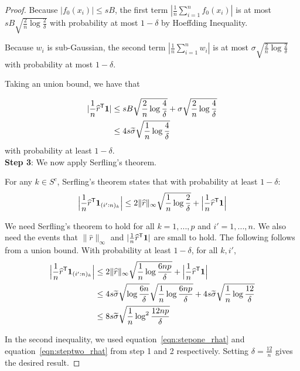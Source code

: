 \begin{proof}
Because $|f_0(x_i)| \leq sB$, the first term $| \frac{1}{n} \sum_{i=1}^n f_0(x_i)|$ is at most $sB \sqrt{\frac{2}{n} \log \frac{2}{\delta}}$ with probability at most $1-\delta$ by Hoeffding Inequality.

Because $w_i$ is sub-Gaussian, the second term $|\frac{1}{n} \sum_{i=1}^n w_i|$ is at most $\sigma \sqrt{ \frac{2}{n} \log \frac{2}{\delta}}$ with probability at most $1-\delta$.

Taking an union bound, we have that 

\begin{align}
| \frac{1}{n} \widehat{r}^{\mathsf{T}} \mbox{\boldmath $1$}| &\leq sB \sqrt{\frac{2}{n} \log \frac{4}{\delta}} +  \sigma \sqrt{\frac{2}{n} \log \frac{4}{\delta}} \nonumber \\
  &\leq 4 s \widetilde{\sigma} \sqrt{\frac{1}{n} \log \frac{4}{\delta}} \label{eqn:steptwo_rhat}
\end{align}
with probability at least $1-\delta$.\\

\textbf{Step 3}: We now apply Serfling's theorem.

For any $k \in S^c$, Serfling's theorem states that with probability at least $1 - \delta$:
\begin{align*}
\Big
|\frac{1}{n} \widehat{r}^{\mathsf{T}} \mbox{\boldmath $1$}_{(i':n)_k}\Big| \leq
   2\| \widehat{r} \|_\infty \sqrt{ \frac{1}{n} \log \frac{2}{\delta}} + 
   \Big|\frac{1}{n} \widehat{r}^{\mathsf{T}} \mbox{\boldmath $1$} \Big|
\end{align*}

We need Serfling's theorem to hold for all $k = 1,...,p$ and $i' = 1,...,n$. We also need the events that $\|\hat{r}\|_\infty$ and $| \frac{1}{n} \widehat{r}^{\mathsf{T}} \mbox{\boldmath $1$}|$ are small to hold. The following follows from a union bound. With probability at least $1-\delta$, for all $k,i'$,
\begin{align*}
\Big
|\frac{1}{n} \widehat{r}^{\mathsf{T}} \mbox{\boldmath $1$}_{(i':n)_k}\Big| &\leq
   2\| \widehat{r} \|_\infty \sqrt{ \frac{1}{n} \log \frac{6np}{\delta}} + 
   \Big|\frac{1}{n} \widehat{r}^{\mathsf{T}} \mbox{\boldmath $1$} \Big|\\
  &\leq 4s\widetilde{\sigma}\sqrt{\log \frac{6n}{\delta}} \sqrt{\frac{1}{n}\log \frac{6np}{\delta}} + 4 s \widetilde{\sigma} \sqrt{\frac{1}{n}\log \frac{12}{\delta}} \\
  &\leq 8 s\widetilde{\sigma} \sqrt{ \frac{1}{n} \log^2 \frac{12np}{\delta}}
\end{align*}

In the second inequality, we used equation~\ref{eqn:stepone_rhat} and equation~\ref{eqn:steptwo_rhat} from step 1 and 2 respectively. Setting $\delta = \frac{12}{n}$ gives the desired result.


\end{proof}

